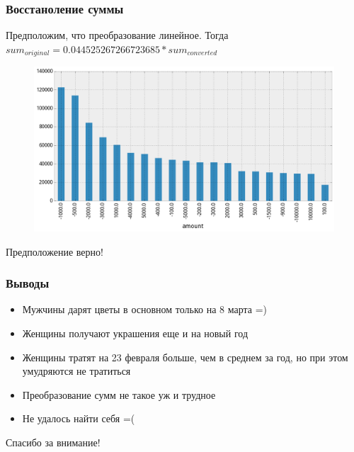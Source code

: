 \documentclass{beamer}
\begin{document}
\begin{frame}
\frametitle{Восстаноление суммы}

Предположим, что преобразование линейное. Тогда $sum_{original} = 0.044525267266723685 * sum_{converted}$

\begin{figure}
    \includegraphics[width=1\linewidth]{pics/amount_count_conv.png}
\end{figure}

Предположение верно!

\end{frame}


\begin{frame}
\frametitle{Выводы}

\begin{itemize}
    \item Мужчины дарят цветы в основном только на 8 марта =)
    \item Женщины получают украшения еще и на новый год
    \item Женщины тратят на 23 февраля больше, чем в среднем за год, но при этом умудряются не тратиться
    \item Преобразование сумм не такое уж и трудное
    \item Не удалось найти себя =(
\end{itemize}

\end{frame}


\begin{frame}
\LARGE{\centerline{Спасибо за внимание!}}
\end{frame}

\end{document}

